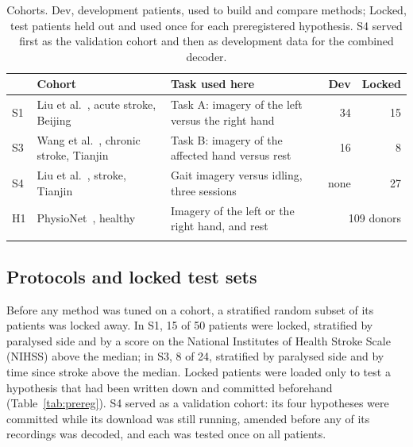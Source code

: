\documentclass[pdflatex,sn-mathphys-num]{sn-jnl}
\begin{document}
\begin{table}[!htbp]
\caption{Cohorts. Dev, development patients, used to build and compare methods; Locked, test patients held out and used once for each preregistered hypothesis. S4 served first as the validation cohort and then as development data for the combined decoder.}\label{tab:cohorts}
\footnotesize
\begin{tabular}{@{}l>{\raggedright\arraybackslash}p{}>{\raggedright\arraybackslash}p{}rr@{}}
\toprule
 & Cohort & Task used here & Dev & Locked\\
\midrule
S1 & Liu et al.~\cite{liu2024}, acute stroke, Beijing & Task A: imagery of the left versus the right hand & 34\footnotemark[1] & 15\\
S3 & Wang et al.~\cite{wang2026}, chronic stroke, Tianjin & Task B: imagery of the affected hand versus rest & 16 & 8\\
S4 & Liu et al.~\cite{liu2025gait}, stroke, Tianjin & Gait imagery versus idling, three sessions & none & 27\footnotemark[2]\\
H1 & PhysioNet~\cite{schalk2004,goldberger2000}, healthy & Imagery of the left or the right hand, and rest & \multicolumn{2}{r}{109 donors}\\
\botrule
\end{tabular}
\end{table}

\subsection{Protocols and locked test sets}\label{sec:protocols}

Before any method was tuned on a cohort, a stratified random subset of its patients was locked away. In S1, 15 of 50 patients were locked, stratified by paralysed side and by a score on the National Institutes of Health Stroke Scale (NIHSS) above the median; in S3, 8 of 24, stratified by paralysed side and by time since stroke above the median. Locked patients were loaded only to test a hypothesis that had been written down and committed beforehand (Table~\ref{tab:prereg}). S4 served as a validation cohort: its four hypotheses were committed while its download was still running, amended before any of its recordings was decoded, and each was tested once on all patients.
\end{document}
